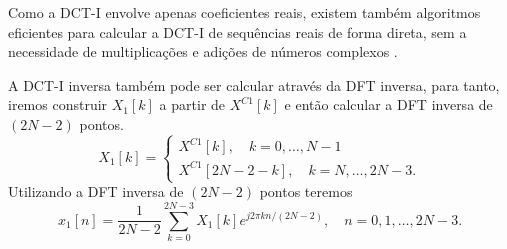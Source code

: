 \begin{frame}[allowframebreaks]
        Como a DCT-I envolve apenas coeficientes reais, existem também algoritmos eficientes para calcular a DCT-I
        de sequências reais de forma direta, sem a necessidade de multiplicações e adições de números complexos
        \cite{ahmed1974,chen1977}.

        \framebreak
        A DCT-I inversa também pode ser calcular através da DFT inversa, para tanto, iremos construir $X_1[k]$
        a partir de $X^{C1}[k]$ e então calcular a DFT inversa de $(2N-2)$ pontos.
        \begin{equation}
        X_1 [k] = \begin{cases} X^{C1}[k], \quad k = 0, \ldots, N-1 \\ 
                                X^{C1}[2N-2-k], \quad k = N, \ldots, 2N-3. \end{cases}
        \end{equation}
        Utilizando a DFT inversa de $(2N-2)$ pontos teremos
        \begin{equation}
        x_1[n] = \frac{1}{2N-2} \sum_{k=0}^{2N-3} X_1[k] e^{j 2 \pi kn/(2N-2)} , \quad n = 0, 1, \ldots, 2N-3.
        \end{equation}
\end{frame}


